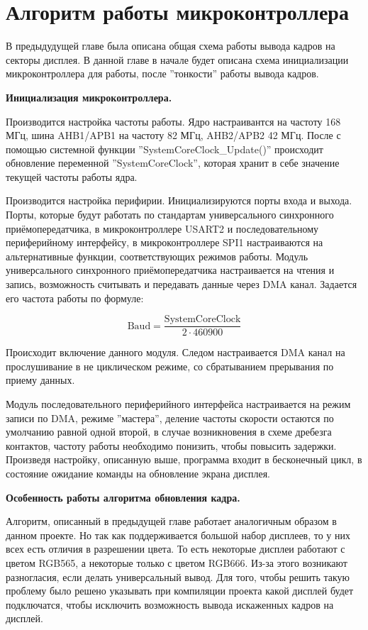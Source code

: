\chapter{Алгоритм работы микроконтроллера}

	В предыдудущей главе была описана общая схема работы вывода кадров на секторы дисплея. В данной главе в начале будет описана схема инициализации микроконтроллера для работы, после ''тонкости'' работы вывода кадров.
	
	\textbf{Инициализация микроконтроллера.}
	
	Производится настройка частоты работы. Ядро настраивантся на частоту 168 МГц, шина AHB1/APB1 на частоту 82 МГц, AHB2/APB2 42 МГц. После с помощью системной функции ''SystemCoreClock\_Update()'' происходит обновление переменной ''SystemCoreClock'', которая хранит в себе значение текущей частоты работы ядра.
	
	Производится настройка перифирии. Инициализируются порты входа и выхода. Порты, которые будут работать по стандартам универсального синхронного приёмопередатчика, в микроконтроллере USART2 и последовательному периферийному интерфейсу, в микроконтроллере SPI1 настраиваются на альтернативные функции, соответствующих режимов работы. Модуль универсального синхронного приёмопередатчика настраивается на чтения и запись, возможность считывать и передавать данные через DMA канал. Задается его частота работы по формуле:
	
	\[\text{Baud} = \frac{\text{SystemCoreClock}}{2 \cdot 460900}\]
	
	Происходит включение данного модуля. Следом настраивается DMA канал на прослушивание в не циклическом режиме, со сбратыванием прерывания по приему данных. 
	
	Модуль последовательного периферийного интерфейса настраивается на режим записи по DMA, режиме ''мастера'', деление частоты скорости остаются по умолчанию равной одной второй, в случае возникновения в схеме дребезга контактов, частоту работы необходимо понизить, чтобы повысить задержки. Произведя настройку, описанную выше, программа входит в бесконечный цикл, в состояние ожидание команды на обновление экрана дисплея.
	
	\textbf{Особенность работы алгоритма обновления кадра.}
	
	Алгоритм, описанный в предыдущей главе работает аналогичным образом в данном проекте. Но так как поддерживается большой набор дисплеев, то у них всех есть отличия в разрешении цвета. То есть некоторые дисплеи работают с цветом RGB565, а некоторые только с цветом RGB666. Из-за этого возникают разногласия, если делать универсальный вывод. Для того, чтобы решить такую проблему было решено указывать при компиляции проекта какой дисплей будет подключатся, чтобы исключить возможность вывода искаженных кадров на дисплей.
	
